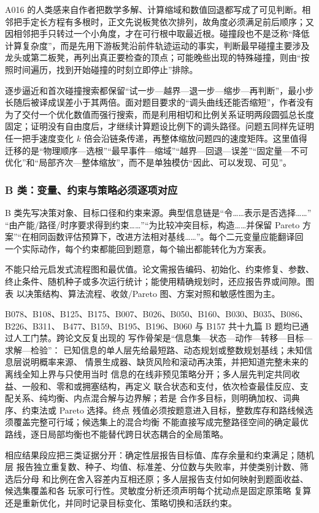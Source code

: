 \documentclass[UTF8,a4paper,12pt]{ctexart}
\begin{document}
A016 的人类感来自作者把数学多解、计算缩域和数值回退都写成了可见判断。相邻把手定长方程有多根时，正文先说板凳依次排列，故角度必须满足前后顺序；又因相邻把手只转过一个小角度，才在可行根中取最近根。碰撞段也不是泛称“降低计算复杂度”，而是先用下游板凳沿前件轨迹运动的事实，判断最早碰撞主要涉及龙头或第二板凳，再列出真正要检查的顶点；可能晚些出现的特殊碰撞，则由“按照时间遍历，找到开始碰撞的时刻立即停止”排除。

逐步逼近和首次碰撞搜索都保留“试一步—越界—退一步—缩步—再判断”，最小步长随后被译成误差小于其两倍。面对题目要求的“调头曲线还能否缩短”，作者没有为了交付一个优化数值而强行搜索，而是利用相切和比例关系证明两段圆弧总长度固定；证明没有自由度后，才继续计算题设比例下的调头路径。问题五同样先证明任一把手速度变化 $k$ 倍会沿链条传递，再整体缩放问题四的速度矩阵。这里值得迁移的是“物理顺序—选根”“最早事件—缩域”“越界—回退—误差”“固定量—不可优化”和“局部齐次—整体缩放”，而不是单独模仿“因此、可以发现、可见”。

\subsubsection{B 类：变量、约束与策略必须逐项对应}

B 类先写决策对象、目标口径和约束来源。典型信息链是“令……表示是否选择……”
“由产能/路径/时序要求得到约束……”“为比较冲突目标，构造……并保留 Pareto
方案”“在相同函数评估预算下，改进方法相对基线……”。每个二元变量应能翻译回
一个实际动作，每个约束都能回到题意，每个输出都能转化为方案表。

不能只给元启发式流程图和最优值。论文需报告编码、初始化、约束修复、参数、
终止条件、随机种子或多次运行统计；能使用精确规划时，还应报告界或间隙。图表
以决策结构、算法流程、收敛/Pareto 图、方案对照和敏感性图为主。

B078、B108、B125、B175、B007、B026、B050、B160、B030、B035、B086、B226、B311、
B477、B159、B195、B196、B060 与 B157 共十九篇 B 题均已通过人工门禁。跨论文反复出现的
写作骨架是“信息集—状态—动作—转移—目标—求解—检验”：
已知信息的单人层先给最短路、动态规划或整数规划基线；未知信息层说明概率来源、
情景生成器、缺货风险和滚动再决策，并把知道完整未来的离线全知上界与只使用当时
信息的在线非预见策略分开；多人层先判定共同收益、一般和、零和或拥塞结构，再定义
联合状态和支付，依次检查最佳反应、支配关系、纯均衡、内点混合解与边界解；若是
合作多目标，则明确加权、词典序、约束法或 Pareto 选择。终点
残值必须按题意进入目标，整数库存和路线候选须覆盖完整可行域；候选集上的混合均衡
不能直接写成完整路径空间的确定最优路线，逐日局部均衡也不能替代跨日状态耦合的全局策略。

相应结果段应把三类证据分开：确定性层报告目标值、库存余量和约束满足；随机层
报告独立重复数、种子、均值、标准差、分位数与失败率，并使类别计数、筛选后分母
和比例在舍入容差内互相还原；多人层报告支付如何映射到题面收益、候选集覆盖和各
玩家可行性。灵敏度分析还须声明每个扰动点是固定原策略
复算还是重新优化，并同时记录目标变化、策略切换和活跃约束。
\end{document}

